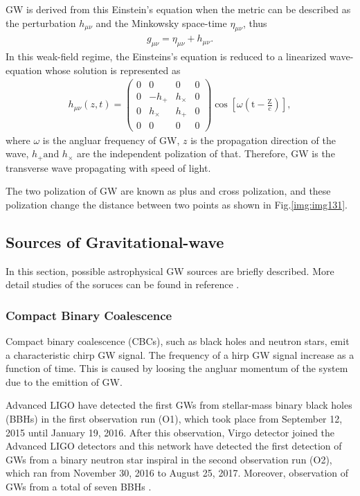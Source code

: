 GW is derived from this Einstein's equation when the metric can be described as the perturbation $h_{\mu\nu}$ and the Minkowsky space-time $\eta_{\mu\nu}$, thus
\begin{eqnarray}
  g_{\mu \nu}=\eta_{\mu \nu}+h_{\mu \nu}.
\end{eqnarray}
In this weak-field regime, the Einsteins's equation is reduced to a linearized wave-equation whose solution is represented as
\begin{eqnarray}
  h_{\mu \nu}(z, t)=\left(\begin{array}{cccc}{0} & {0} & {0} & {0} \\ {0} & {-h_{+}} & {h_{\times}} & {0} \\ {0} & {h_{\times}} & {h_{+}} & {0} \\ {0} & {0} & {0} & {0}\end{array}\right) \cos \left[\omega\left(\mathrm{t}-\frac{\mathrm{Z}}{\mathrm{c}}\right)\right], \label{eq:eq130}
\end{eqnarray}
where $\omega$ is the angluar frequency of GW, $z$ is the propagation direction of the wave, $h_{+} \text {and } h_{\times}$ are the independent polization of that. Therefore, GW is the transverse wave propagating with speed of light.

The two polization of GW are known as plus and cross polization, and these polization change the distance between two points as shown in Fig.\ref{img:img131}. 

\subsection{Sources of Gravitational-wave}
In this section, possible astrophysical GW sources are briefly described. More detail studies of the soruces can be found in reference \cite{cutler2002overview}.

\subsubsection{Compact Binary Coalescence}
Compact binary coalescence (CBCs), such as black holes and neutron stars, emit a characteristic chirp GW signal. The frequency of a hirp GW signal increase as a function of time. This is caused by loosing the angluar momentum of the system due to the emittion of GW. 

Advanced LIGO have detected the first GWs from stellar-mass binary black holes (BBHs) in the first observation run (O1), which took place from September 12, 2015 until January 19, 2016. After this observation, Virgo detector joined the Advanced LIGO detectors and this network have detected the first detection of GWs from a binary neutron star inspiral in the second observation run (O2), which ran from November 30, 2016 to August 25, 2017. Moreover, observation of GWs from a total of seven BBHs \cite{abbott2019gwtc}.

